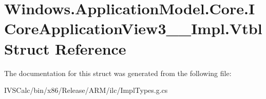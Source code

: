 \hypertarget{struct_windows_1_1_application_model_1_1_core_1_1_i_core_application_view3_____impl_1_1_vtbl}{}\section{Windows.\+Application\+Model.\+Core.\+I\+Core\+Application\+View3\+\_\+\+\_\+\+Impl.\+Vtbl Struct Reference}
\label{struct_windows_1_1_application_model_1_1_core_1_1_i_core_application_view3_____impl_1_1_vtbl}


The documentation for this struct was generated from the following file\+:\begin{DoxyCompactItemize}
\item 
I\+V\+S\+Calc/bin/x86/\+Release/\+A\+R\+M/ilc/Impl\+Types.\+g.\+cs\end{DoxyCompactItemize}
